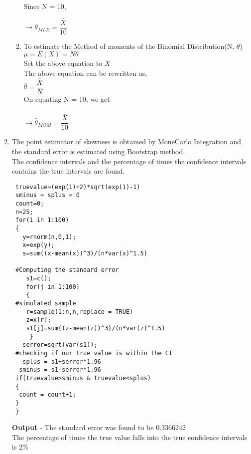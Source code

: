 \documentclass[11pt]{article}
\begin{document}
\begin{enumerate}
\begin{enumerate}
Since N = 10,

$\rightarrow \theta_{MLE} = \dfrac{\bar{X}}{10}$\\


\item To estimate the Method of moments of the Binomial Distribution(N, $\theta$) \\

$\mu = E(X) = N \theta$\\

Set the above equation to $\bar{X}$\\

The above equation can be rewritten as,\\
$\hat{\theta} = \dfrac{\bar{X}}{N}$\\
On equating N = 10; we get\\\\
$\rightarrow \hat\theta_{MOM} = \dfrac{\bar{X}}{10}$\\

\end{enumerate}


\item
The point estimator of skewness is obtained by MoneCarlo Integration and the standard error is estimated using Bootstrap method.\\
The confidence intervals and the percentage of times the confidence intervals contains the true intervals are found.\\

\begin{verbatim}
 truevalue=(exp(1)+2)*sqrt(exp(1)-1)
 sminus = splus = 0
 count=0;
 n=25;
 for(i in 1:100)
 {
   y=rnorm(n,0,1);
   x=exp(y);
   s=sum((x-mean(x))^3)/(n*var(x)^1.5)
  
 #Computing the standard error
    s1=c();
    for(j in 1:100)
    {
 #simulated sample
    r=sample(1:n,n,replace = TRUE)
    z=x[r];
    s1[j]=sum((z-mean(z))^3)/(n*var(z)^1.5)
     }
   serror=sqrt(var(s1));
 #checking if our true value is within the CI
   splus = s1+serror*1.96  
  sminus = s1-serror*1.96
 if(truevalue>sminus & truevalue<splus)
 {
  count = count+1;
 }
 }

\end{verbatim}

\textbf{Output} - The standard error was found to be 0.3366242\\
The percentage of times the true value falls into the true confidence intervals is $2\%$


\end{enumerate}
\end{document}
